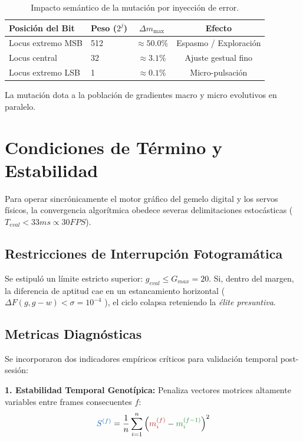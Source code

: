 \documentclass[11pt, a4paper, twocolumn]{article}
\begin{document}
\begin{table}[H]
    \centering
    \footnotesize
    \begin{tabular}{@{}llcc@{}}
        \toprule
        \textbf{Posición del Bit} & \textbf{Peso ($2^j$)} & $\Delta m_{\text{max}}$ & \textbf{Efecto}\\
        \midrule
        Locus extremo MSB & 512 & $\approx 50.0\%$ & Espasmo / Exploración \\
        Locus central & 32 & $\approx 3.1\%$ & Ajuste gestual fino \\
        Locus extremo LSB & 1 & $\approx 0.1\%$ & Micro-pulsación \\
        \bottomrule
    \end{tabular}
    \caption{Impacto semántico de la mutación por inyección de error.}
\end{table}

La mutación dota a la población de gradientes macro y micro evolutivos en paralelo.


\section{Condiciones de Término y Estabilidad}

Para operar sincrónicamente el motor gráfico del gemelo digital y los servos físicos, la convergencia algorítmica obedece severas delimitaciones estocásticas ($T_{eval} < 33ms \propto 30FPS$).

\subsection{Restricciones de Interrupción Fotogramática}
Se estipuló un límite estricto superior: $g_{eval} \leq G_{max} = 20$. Si, dentro del margen, la diferencia de aptitud cae en un estancamiento horizontal ( $\Delta F(g, g-w) < \sigma = 10^{-4}$ ), el ciclo colapsa reteniendo la \textit{élite presuntiva}.

\subsection{Metricas Diagnósticas}
Se incorporaron dos indicadores empíricos críticos para validación temporal post-sesión:

\noindent\textbf{1. Estabilidad Temporal Genotípica:} Penaliza vectores motrices altamente variables entre frames consecuentes $f$:
$$ \textcolor{coreblue}{S^{(f)}} = \frac{1}{n} \sum_{i=1}^{n} \left( \textcolor{corered}{m_i^{(f)}} - \textcolor{coregreen}{m_i^{(f-1)}} \right)^2 $$
\end{document}
